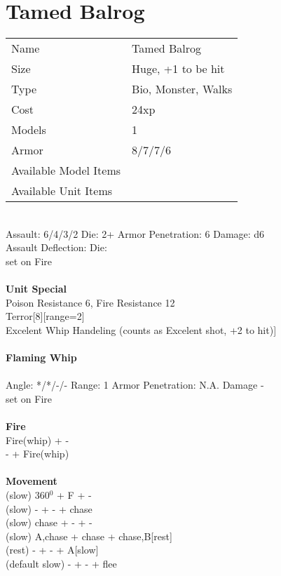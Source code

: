 






\pagebreak

\section{ Tamed Balrog }

\begin{tabular}{ll}
  Name & Tamed Balrog \\
  Size & Huge, +1 to be hit\\
  Type & Bio, Monster, Walks\\
  Cost & 24xp\\
  Models & 1\\
  Armor & 8/7/7/6\\
  Available Model Items &  \\
  Available Unit Items &  \\
\end{tabular}

\ \\
Assault: 6/4/3/2 Die: 2+ Armor Penetration: 6 Damage: d6 \\
Assault Deflection:  Die: \\
\indent set on Fire \\
\ \\

{\bf Unit Special} \\
Poison Resistance 6, Fire Resistance 12 \\ Terror[8][range=2]\\ Excelent Whip Handeling (counts as Excelent shot, +2 to hit)]
\ \\
\ \\
{\bf Flaming Whip } \\
\ \\
Angle: */*/-/- Range: 1 Armor Penetration: N.A. Damage - \\
\indent set on Fire \\





\ \\ {\bf Fire } \\
Fire(whip) + - \\
- + Fire(whip) \\
\ \\ {\bf Movement } \\
(slow) 360$^0$ + F + - \\
(slow) - + - + chase \\
(slow) chase + - + - \\
(slow) A,chase + chase + chase,B[rest] \\
(rest) - + - + A[slow] \\
(default slow) - + - + flee \\



